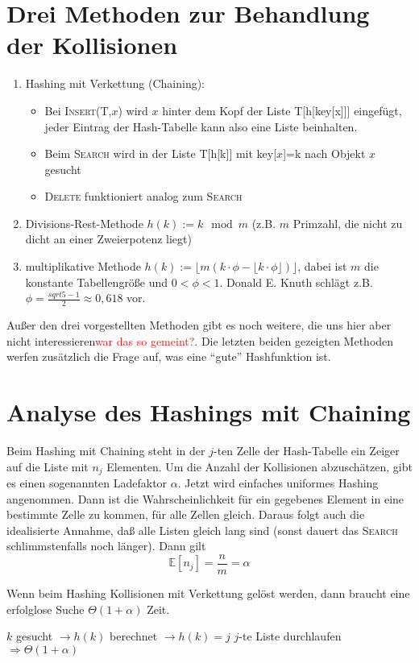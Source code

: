 \section{Drei Methoden zur Behandlung der Kollisionen}
\begin{enumerate}
\item Hashing mit Verkettung (Chaining): 
  \begin{itemize}
  \item Bei \textsc{Insert}(T,$x$) wird $x$ hinter dem Kopf der Liste T[h[key[x]]]
    eingefügt, jeder Eintrag der Hash-Tabelle kann also eine Liste beinhalten. 
  \item Beim \textsc{Search} wird in der Liste T[h[k]] mit key[$x$]=k nach Objekt $x$ gesucht
  \item \textsc{Delete} funktioniert analog zum \textsc{Search}
  \end{itemize}
\item Divisions-Rest-Methode $h(k):=k \mod m$ (z.B. $m$ Primzahl, die nicht zu dicht an einer Zweierpotenz liegt)  
\item multiplikative Methode $h(k):=\lfloor m(k \cdot \phi -\lfloor k \cdot \phi \rfloor) \rfloor$, dabei ist $m$ die
konstante Tabellengröße und $0 < \phi <1$. Donald E. Knuth schlägt z.B. $\phi=\frac{sqrt{5}-1}{2} \approx 0,618$ vor.
\end{enumerate} 
Außer den drei vorgestellten Methoden gibt es noch weitere, die uns hier aber nicht interessieren\textcolor{red}{war
das so gemeint?}. Die letzten beiden gezeigten Methoden werfen zusätz\-lich die Frage auf, was eine
"`gute"' Hashfunktion ist.

\section{Analyse des Hashings mit Chaining}
Beim Hashing mit Chaining steht in der $j$-ten Zelle der Hash-Tabelle ein Zeiger auf die Liste mit $n_j$ Elementen. Um
die Anzahl der Kollisionen abzuschätzen, gibt es einen sogenannten Ladefaktor $\alpha$.
Jetzt wird einfaches uniformes Hashing angenommen. Dann ist die Wahrscheinlichkeit für ein gegebenes Element in eine bestimmte
Zelle zu kommen, für alle Zellen gleich. Daraus folgt auch die idealisierte Annahme, daß alle Listen gleich lang sind
(sonst dauert das \textsc{Search} schlimmstenfalls noch länger). Dann gilt \[\mathbb{E}[n_j]=\frac{n}{m}=\alpha\]

\begin{satz}[Theorem 1]
Wenn beim Hashing Kollisionen mit Verkettung gelöst werden, dann braucht eine erfolg\-lose Suche $\Theta(1+\alpha)$
Zeit.
\end{satz}
\begin{beweis}
$k$ gesucht $\rightarrow h(k)$ berechnet $\rightarrow h(k)=j$ $j$-te Liste durchlaufen $\Rightarrow \Theta(1+\alpha)$
\end{beweis}

